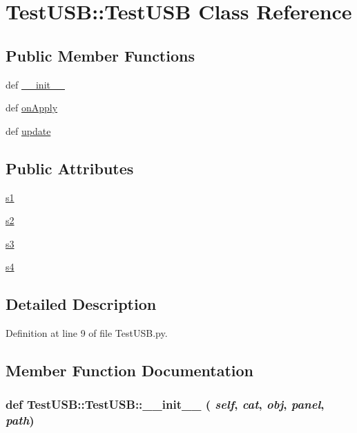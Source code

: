 \hypertarget{classTestUSB_1_1TestUSB}{
\section{TestUSB::TestUSB Class Reference}
\label{classTestUSB_1_1TestUSB}
}
\subsection*{Public Member Functions}
\begin{DoxyCompactItemize}
\item 
def \hyperlink{classTestUSB_1_1TestUSB_aea14af8402396bd8e601252a2b4e478f}{\_\-\_\-init\_\-\_\-}
\item 
def \hyperlink{classTestUSB_1_1TestUSB_a0dc8c506a09d50d93fbfd9bad58d11d4}{onApply}
\item 
def \hyperlink{classTestUSB_1_1TestUSB_a06ebe37772fabab427b7dd89a192f12d}{update}
\end{DoxyCompactItemize}
\subsection*{Public Attributes}
\begin{DoxyCompactItemize}
\item 
\hyperlink{classTestUSB_1_1TestUSB_a91f2d0bdbd9a0a59936c41d9f894882a}{s1}
\item 
\hyperlink{classTestUSB_1_1TestUSB_a3180c62896ef7f8c8115a8736fba2dc9}{s2}
\item 
\hyperlink{classTestUSB_1_1TestUSB_ae82803b0f4d3e1a45bb5e80dba5a12d9}{s3}
\item 
\hyperlink{classTestUSB_1_1TestUSB_acf77fb78e3a4ad7443f8b3a5a035d7dc}{s4}
\end{DoxyCompactItemize}


\subsection{Detailed Description}


Definition at line 9 of file TestUSB.py.

\subsection{Member Function Documentation}
\hypertarget{classTestUSB_1_1TestUSB_aea14af8402396bd8e601252a2b4e478f}{
\subsubsection[{\_\-\_\-init\_\-\_\-}]{\setlength{\rightskip}{0pt plus 5cm}def TestUSB::TestUSB::\_\-\_\-init\_\-\_\- ( {\em self}, \/   {\em cat}, \/   {\em obj}, \/   {\em panel}, \/   {\em path})}}
\label{classTestUSB_1_1TestUSB_aea14af8402396bd8e601252a2b4e478f}


